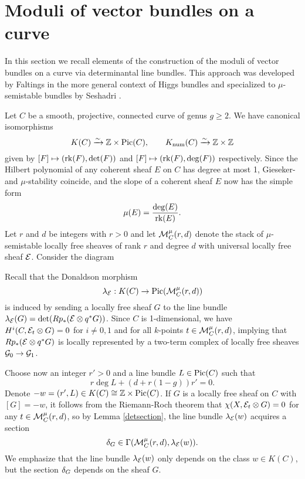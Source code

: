 \section{Moduli of vector bundles on a curve}
In this section we recall elements of the construction of the moduli of vector bundles on a curve via determinantal line bundles. This approach was developed by Faltings in the more general context of Higgs bundles \cite{faltings} and specialized to $\mu$-semistable bundles by Seshadri \cite{seshadri}.

Let $C$ be a smooth, projective, connected curve of genus $g \ge 2$. We have canonical isomorphisms
\[ K(C) \xrightarrow{\sim} \mathbb{Z} \times \mathrm{Pic}(C), \qquad K_{\mathrm{num}}(C) \xrightarrow{\sim} \mathbb{Z} \times \mathbb{Z} \]
given by $[F] \mapsto (\operatorname{\mathrm{rk}}(F), \det(F))$ and $[F] \mapsto (\operatorname{\mathrm{rk}}(F), \deg(F))$ respectively. Since the Hilbert polynomial of any coherent sheaf $E$ on $C$ has degree at most 1, Gieseker- and $\mu$-stability coincide, and the slope of a coherent sheaf $E$ now has the simple form
\[ \mu(E) = \frac{\deg(E)}{\operatorname{\mathrm{rk}}(E)}. \]
Let $r$ and $d$ be integers with $r > 0$ and let $\mathcal{M}^\mu_C(r,d)$ denote the stack of $\mu$-semistable locally free sheaves of rank $r$ and degree $d$ with universal locally free sheaf $\mathcal{E}$. Consider the diagram
\begin{center}
\end{center}
Recall that the Donaldson morphism
\[ \lambda_{\mathcal{E}}: K(C) \to \mathrm{Pic}(\mathcal{M}^\mu_C(r,d)) \]
is induced by sending a locally free sheaf $G$ to the line bundle $\lambda_{\mathcal{E}}(G) = \det(R p_*(\mathcal{E} \otimes q^*G))$. Since $C$ is 1-dimensional, we have $H^i(C, \mathcal{E}_t \otimes G) = 0$ for $i \neq 0, 1$ and for all $k$-points $t \in \mathcal{M}^\mu_C(r,d)$, implying that $R p_*(\mathcal{E} \otimes q^*G)$ is locally represented by a two-term complex of locally free sheaves $\mathcal{G}_0 \to \mathcal{G}_1$. 

Choose now an integer $r' > 0$ and a line bundle $L \in \mathrm{Pic}(C)$ such that
\[ r \deg L + (d + r(1-g)) r' = 0. \]
Denote $-w = (r', L) \in K(C) \cong \mathbb{Z} \times \mathrm{Pic}(C)$. If $G$ is a locally free sheaf on $C$ with $[G] = -w$, it follows from the Riemann-Roch theorem that $\chi(X, \mathcal{E}_t \otimes G) = 0$ for any $t \in \mathcal{M}^\mu_C(r,d)$, so by Lemma \ref{detsection}, the line bundle $\lambda_{\mathcal{E}}(w)$ acquires a section 
\[ \delta_G \in \Gamma(\mathcal{M}^\mu_C(r,d), \lambda_{\mathcal{E}}(w)). \]
We emphasize that the line bundle $\lambda_{\mathcal{E}}(w)$ only depends on the class $w \in K(C)$, but the section $\delta_G$ depends on the sheaf $G$.

